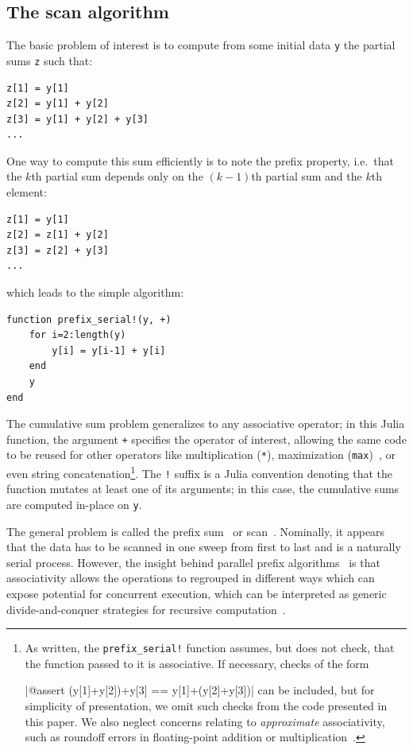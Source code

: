 \documentclass{sig-alternate}
\newcommand{\code}[1]{\texttt{#1}}
\begin{document}
\subsection{The scan algorithm}
\label{sec:prefix}

The basic problem of interest is to compute from some initial data \code{y} the
partial sums \code{z} such that:

\begin{verbatim}
z[1] = y[1]
z[2] = y[1] + y[2]
z[3] = y[1] + y[2] + y[3]
...
\end{verbatim}
%
One way to compute this sum efficiently is to note the prefix property, i.e.\
that the $k$th partial sum depends only on the $(k-1)$th partial sum and the
$k$th element: 

\begin{verbatim}
z[1] = y[1]
z[2] = z[1] + y[2]
z[3] = z[2] + y[3]
...
\end{verbatim}
%
which leads to the simple algorithm:

\begin{verbatim}
function prefix_serial!(y, +)
    for i=2:length(y)
        y[i] = y[i-1] + y[i]
    end
    y
end
\end{verbatim}

The cumulative sum problem generalizes to any associative operator; in this
Julia function, the argument \code{+} specifies the operator of interest,
allowing the same code to be reused for other operators like multiplication
(\code{*}), maximization (\code{max})~\cite{Shah2013}, or even string
concatenation\footnote{As written, the \code{prefix\allowbreak\_serial!}
function assumes, but does not check, that the function passed to it is
associative. If necessary, checks of the form

|@assert (y[1]+y[2])+y[3] == y[1]+(y[2]+y[3])|
%
can be included, but for simplicity of presentation, we omit such checks from
the code presented in this paper. We also neglect concerns relating to
\textit{approximate} associativity, such as roundoff errors in floating-point
addition or multiplication~\cite{Mathias1995}.}. The \code{!} suffix is a Julia
convention denoting that the function mutates at least one of its arguments; in
this case, the cumulative sums are computed in-place on \code{y}.

The general problem is called the prefix sum~\cite{Blelloch1989,Blelloch1993} or 
scan~\cite{Iverson1962,Iverson1979}. Nominally, it appears that the data has to
be scanned in one sweep from first to last and is a naturally serial process.
However, the insight behind parallel prefix
algorithms~\cite{Blelloch1989,Brent1982,Kogge1973,Kruskal1985,Ladner1980,Sklansky1960}
is that associativity allows the operations to regrouped in different ways
which can expose potential for concurrent execution, which can be interpreted
as generic divide-and-conquer strategies for recursive computation~\cite{Smith1987}.
\end{document}
